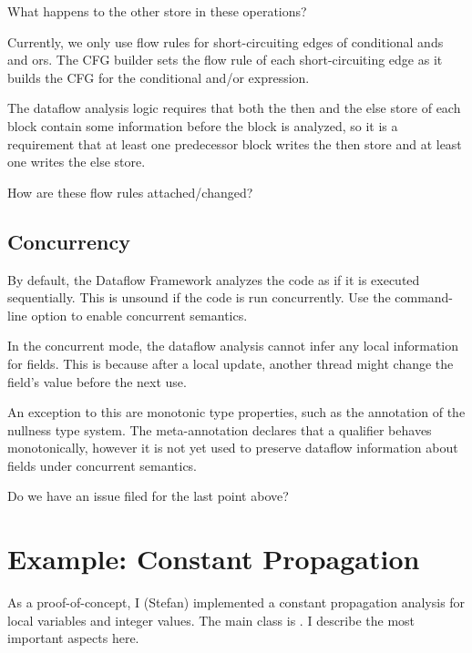 \begin{workinprogress}
What happens to the other store in these operations?
\end{workinprogress}

Currently, we only use flow rules for short-circuiting edges of
conditional ands and ors.  The CFG builder sets the flow rule of each
short-circuiting edge as it builds the CFG for the conditional and/or
expression.

The dataflow analysis logic requires that both the then and the else
store of each block contain some information before the block is
analyzed, so it is a requirement that at least one predecessor block
writes the then store and at least one writes the else store.

\begin{workinprogress}
How are these flow rules attached/changed?
\end{workinprogress}


\subsection{Concurrency}

By default, the Dataflow Framework analyzes the code as if it is
executed sequentially.  This is unsound if the code is run
concurrently.  Use the  command-line
option to enable concurrent semantics.

In the concurrent mode, the dataflow analysis cannot infer any
local information for fields.  This is because after a local update,
another thread might change the field's value before the next use.

An exception to this are monotonic type properties, such as the
 annotation of the nullness type system.  The
meta-annotation  declares that a qualifier
behaves monotonically, however it is not yet used to preserve dataflow
information about fields under concurrent semantics.

\begin{workinprogress}
Do we have an issue filed for the last point above?
\end{workinprogress}


\section{Example: Constant Propagation}

As a proof-of-concept, I (Stefan) implemented a constant propagation
analysis for local variables and integer values.  The main class is
.  I
describe the most important aspects here.

